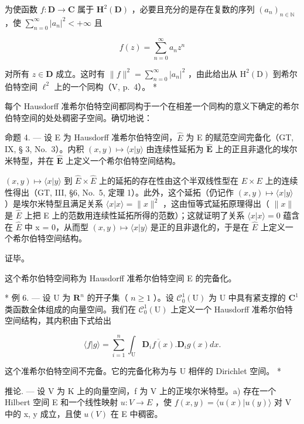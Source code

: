 为使函数 \(f: \mathbf{D} \to \mathbf{C}\) 属于 \(\mathbf{H}^2(\mathbf{D})\) ，必要且充分的是存在复数的序列 \((a_n)_{n \in \mathbb{N}}\) ，使 \(\sum_{n=0}^{\infty} |a_n|^2 < +\infty\) 且

\[
f (z) = \sum_ {n = 0} ^ {\infty} a _ {n} z ^ {n}
\]

对所有 \(z \in \mathbf{D}\) 成立。这时有 \(\| f\|^2 = \sum_{n=0}^{\infty} |a_n|^2\) ，由此给出从 \(\mathrm{H}^2(\mathrm{D})\) 到希尔伯特空间 \(\ell^2\) 上的一个同构（V, p.~4）。 *

每个 Hausdorff 准希尔伯特空间都同构于一个在相差一个同构的意义下确定的希尔伯特空间的处处稠密子空间。确切地说：

命题 4. --- 设 E 为 Hausdorff 准希尔伯特空间，\(\hat{E}\) 为 E 的赋范空间完备化（GT, IX, § 3, No.~3）。内积 \((x, y) \mapsto \langle x|y \rangle\) 由连续性延拓为 \(\hat{\mathbf{E}}\) 上的正且非退化的埃尔米特型，并在 \(\hat{\mathbf{E}}\) 上定义一个希尔伯特空间结构。

\((x, y) \mapsto \langle x|y \rangle\) 到 \(\hat{E} \times \hat{E}\) 上的延拓的存在性由这个半双线性型在 \(E \times E\) 上的连续性得出（GT, III, §6, No.~5, 定理 1）。此外，这个延拓（仍记作 \((x, y) \mapsto \langle x|y \rangle\) ）是埃尔米特型且满足关系 \(\langle x|x\rangle = \|x\|^2\) ，这由恒等式延拓原理得出（ \(\|x\|\) 是 \(\hat{E}\) 上把 E 上的范数用连续性延拓所得的范数）；这就证明了关系 \(\langle x|x\rangle = 0\) 蕴含在 \(\hat{E}\) 中 x = 0，从而型 \((x, y) \mapsto \langle x|y \rangle\) 是正的且非退化的，于是在 \(\hat{E}\) 上定义一个希尔伯特空间结构。

证毕。

这个希尔伯特空间称为 Hausdorff 准希尔伯特空间 E 的完备化。

* 例 6. --- 设 U 为 \(\mathbf{R}^n\) 的开子集（ \(n \geqslant 1\) ）。设 \(\mathcal{C}_0^1(\mathrm{U})\) 为 U 中具有紧支撑的 \(\mathbf{C}^1\) 类函数全体组成的向量空间。我们在 \(\mathcal{C}_0^1(\mathrm{U})\) 上定义一个 Hausdorff 准希尔伯特空间结构，其内积由下式给出

\[
\langle f | g \rangle = \sum_ {i = 1} ^ {n} \int_ {\mathrm{U}} \overline {{{{\mathbf {D} _ {i} f (x)}}}}. \mathbf {D} _ {i} g (x) d x.
\]

这个准希尔伯特空间不完备。它的完备化称为与 U 相伴的 Dirichlet 空间。 *

推论. --- 设 V 为 K 上的向量空间，f 为 V 上的正埃尔米特型。a) 存在一个 Hilbert 空间 E 和一个线性映射 \(u:V \rightarrow E\) ，使 \(f(x,y) = \langle u(x)|u(y) \rangle\) 对 V 中的 x, y 成立，且使 \(u(V)\) 在 E 中稠密。

